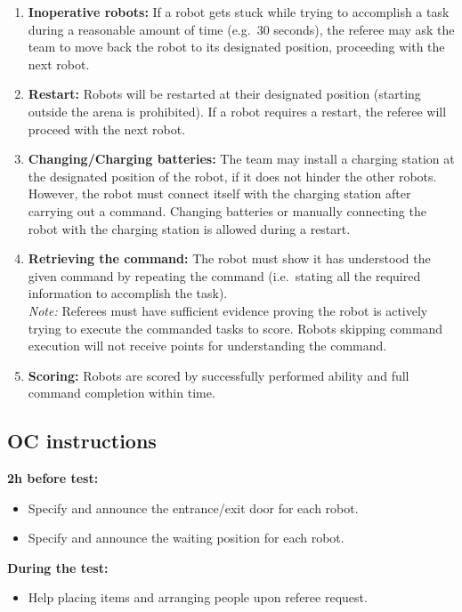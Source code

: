 \begin{enumerate}
	\item \textbf{Inoperative robots:} If a robot gets stuck while trying to accomplish a task during a reasonable amount of time (e.g.~30 seconds), the referee may ask the team to move back the robot to its designated position, proceeding with the next robot.

	\item \textbf{Restart:} Robots will be restarted at their designated position (starting outside the arena is prohibited). If a robot requires a restart, the referee will proceed with the next robot.

	\item \textbf{Changing/Charging batteries:} The team may install a charging station at the designated position of the robot, if it does not hinder the other robots. However, the robot must connect itself with the charging station after carrying out a command. Changing batteries or manually connecting the robot with the charging station is allowed during a restart.

	\item \textbf{Retrieving the command:} The robot must show it has understood the given command by repeating the command (i.e.~stating all the required information to accomplish the task).
	\\
	\textit{Note:} Referees must have sufficient evidence proving the robot is actively trying to execute the commanded tasks to score. Robots skipping command execution will not receive points for understanding the command.

	\item \textbf{Scoring:} Robots are scored by successfully performed ability and full command completion within time.
\end{enumerate}

\subsection{OC instructions}
\textbf{2h before test:}
\begin{itemize}
	\item Specify and announce the entrance/exit door for each robot.
	\item Specify and announce the waiting position for each robot.
\end{itemize}
\textbf{During the test:}
\begin{itemize}
	\item Help placing items and arranging people upon referee request.
\end{itemize}

